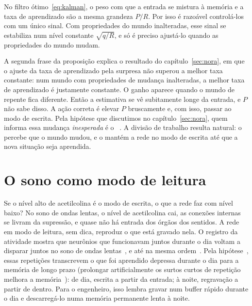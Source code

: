 \begin{keyblock}
\begin{proposition}
\label{prop:kalman}
No filtro ótimo~\eqref{eq:kalman}, o peso com que a entrada se mistura à memória e a taxa de aprendizado são a mesma grandeza $P/R$. Por isso é razoável controlá-los com um único sinal. Com propriedades do mundo inalteradas, esse sinal se estabiliza num nível constante $\sqrt{q/R}$, e só é preciso ajustá-lo quando as propriedades do mundo mudam.
\end{proposition}
\end{keyblock}

A segunda frase da proposição explica o resultado do capítulo~\ref{sec:nora}, em que o ajuste da taxa de aprendizado pela surpresa não superou a melhor taxa constante: num mundo com propriedades de mudança inalteradas, a melhor taxa de aprendizado é justamente constante. O ganho aparece quando o mundo de repente fica diferente. Então a estimativa se vê subitamente longe da entrada, e $P$ não sabe disso. A ação correta é elevar $P$ bruscamente e, com isso, passar ao modo de escrita. Pela hipótese que discutimos no capítulo~\ref{sec:nora}, quem informa essa mudança \emph{inesperada} é o ~\cite{YuDayan2005}. A divisão de trabalho resulta natural: o  percebe que o mundo mudou, e o  mantém a rede no modo de escrita até que a nova situação seja aprendida.

\section{O sono como modo de leitura}

Se o nível alto de acetilcolina é o modo de escrita, o que a rede faz com nível baixo? No sono de ondas lentas, o nível de acetilcolina cai, as conexões internas se livram da supressão, e quase não há entrada dos órgãos dos sentidos. A rede em modo de leitura, sem dica, reproduz o que está gravado nela. O registro da atividade mostra que neurônios que funcionavam juntos durante o dia voltam a disparar juntos no sono de ondas lentas~\cite{WilsonMcNaughton1994}, e até na mesma ordem~\cite{Skaggs1996}. Pela hipótese~\cite{Hasselmo1999}, essas repetições transcrevem o que foi aprendido depressa durante o dia para a memória de longo prazo (prolongar artificialmente os surtos curtos de repetição melhora a memória~\cite{FernandezRuiz2019}): de dia, escrita a partir da entrada; à noite, regravação a partir de dentro. Para o engenheiro, isso lembra gravar num buffer rápido durante o dia e descarregá-lo numa memória permanente lenta à noite.

